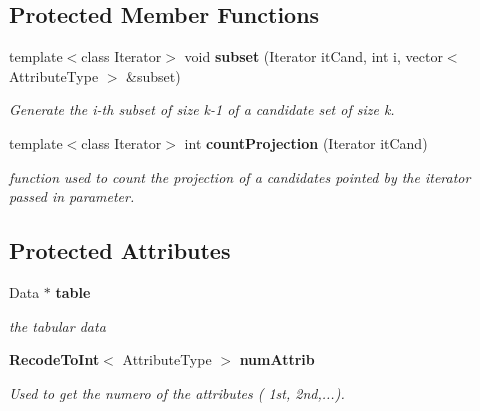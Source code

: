 \subsection*{Protected Member Functions}
\begin{CompactItemize}
\item 
template$<$class Iterator$>$ void {\bf subset} (Iterator it\-Cand, int i, vector$<$ Attribute\-Type $>$ \&subset)
\begin{CompactList}\small\item\em Generate the i-th subset of size k-1 of a candidate set of size k. \item\end{CompactList}\item 
template$<$class Iterator$>$ int {\bf count\-Projection} (Iterator it\-Cand)
\begin{CompactList}\small\item\em function used to count the projection of a candidates pointed by the iterator passed in parameter. \item\end{CompactList}\end{CompactItemize}
\subsection*{Protected Attributes}
\begin{CompactItemize}
\item 
Data $\ast$ {\bf table}\label{class_not_redundant__base_332c76670be6975fddd8b7b7f52cae94}

\begin{CompactList}\small\item\em the tabular data \item\end{CompactList}\item 
{\bf Recode\-To\-Int}$<$ Attribute\-Type $>$ {\bf num\-Attrib}\label{class_not_redundant__base_9e18cbc6284d736b782c816199596f78}

\begin{CompactList}\small\item\em Used to get the numero of the attributes ( 1st, 2nd,...). \item\end{CompactList}\end{CompactItemize}

